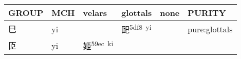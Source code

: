 \documentclass[14pt,a4paper]{scrartcl}
\begin{document}
\begin{longtable}[c]{@{}llllll@{}}
\toprule
\begin{minipage}[b]{0.14\columnwidth}\raggedright\strut
GROUP
\strut\end{minipage} &
\begin{minipage}[b]{0.14\columnwidth}\raggedright\strut
MCH
\strut\end{minipage} &
\begin{minipage}[b]{0.14\columnwidth}\raggedright\strut
velars
\strut\end{minipage} &
\begin{minipage}[b]{0.14\columnwidth}\raggedright\strut
glottals
\strut\end{minipage} &
\begin{minipage}[b]{0.14\columnwidth}\raggedright\strut
none
\strut\end{minipage} &
\begin{minipage}[b]{0.14\columnwidth}\raggedright\strut
PURITY
\strut\end{minipage}\tabularnewline
\midrule
\endhead
\begin{minipage}[t]{0.14\columnwidth}\raggedright\strut
巳
\strut\end{minipage} &
\begin{minipage}[t]{0.14\columnwidth}\raggedright\strut
yi
\strut\end{minipage} &
\begin{minipage}[t]{0.14\columnwidth}\raggedright\strut
\strut\end{minipage} &
\begin{minipage}[t]{0.14\columnwidth}\raggedright\strut
巸\textsuperscript{5df8~yi}
\strut\end{minipage} &
\begin{minipage}[t]{0.14\columnwidth}\raggedright\strut
\strut\end{minipage} &
\begin{minipage}[t]{0.14\columnwidth}\raggedright\strut
pure:glottals
\strut\end{minipage}\tabularnewline
\begin{minipage}[t]{0.14\columnwidth}\raggedright\strut
𦣝
\strut\end{minipage} &
\begin{minipage}[t]{0.14\columnwidth}\raggedright\strut
yi
\strut\end{minipage} &
\begin{minipage}[t]{0.14\columnwidth}\raggedright\strut
姬\textsuperscript{59ec~ki}
\strut\end{minipage} &

\end{longtable}
\end{document}
